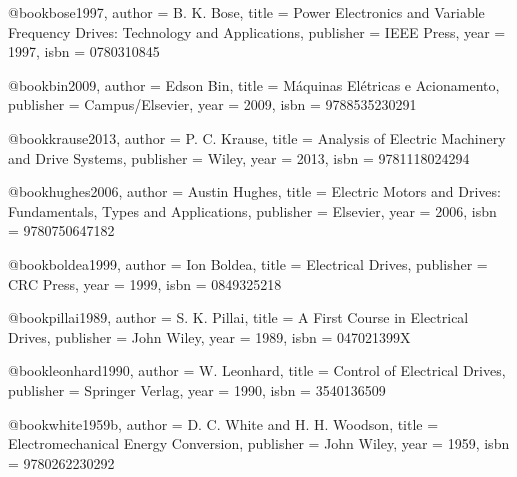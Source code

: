 
%

@book{bose1997,
  author = {B. K. Bose},
  title = {Power Electronics and Variable Frequency Drives: Technology and Applications},
  publisher = {IEEE Press},
  year = {1997},
  isbn = {0780310845}
}

@book{bin2009,
  author = {Edson Bin},
  title = {Máquinas Elétricas e Acionamento},
  publisher = {Campus/Elsevier},
  year = {2009},
  isbn = {9788535230291}
}

@book{krause2013,
  author = {P. C. Krause},
  title = {Analysis of Electric Machinery and Drive Systems},
  publisher = {Wiley},
  year = {2013},
  isbn = {9781118024294}
}

@book{hughes2006,
  author = {Austin Hughes},
  title = {Electric Motors and Drives: Fundamentals, Types and Applications},
  publisher = {Elsevier},
  year = {2006},
  isbn = {9780750647182}
}

@book{boldea1999,
  author = {Ion Boldea},
  title = {Electrical Drives},
  publisher = {CRC Press},
  year = {1999},
  isbn = {0849325218}
}

@book{pillai1989,
  author = {S. K. Pillai},
  title = {A First Course in Electrical Drives},
  publisher = {John Wiley},
  year = {1989},
  isbn = {047021399X}
}

@book{leonhard1990,
  author = {W. Leonhard},
  title = {Control of Electrical Drives},
  publisher = {Springer Verlag},
  year = {1990},
  isbn = {3540136509}
}

@book{white1959b,
  author = {D. C. White and H. H. Woodson},
  title = {Electromechanical Energy Conversion},
  publisher = {John Wiley},
  year = {1959},
  isbn = {9780262230292}
}

